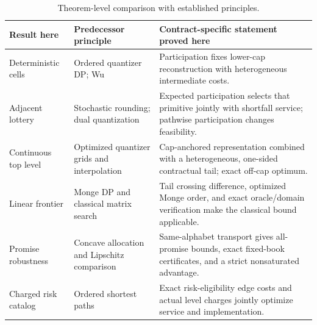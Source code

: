 \begin{table}[p]\centering
\caption{Theorem-level comparison with established principles.}\label{tab:r37-priority}
\small\begin{tabular}{p{}p{}p{}}\toprule
Result here & Predecessor principle & Contract-specific statement proved here\\\midrule
Deterministic cells & Ordered quantizer DP; Wu & Participation fixes lower-cap reconstruction with heterogeneous intermediate costs.\\[3pt]
Adjacent lottery & Stochastic rounding; dual quantization & Expected participation selects that primitive jointly with shortfall service; pathwise participation changes feasibility.\\[3pt]
Continuous top level & Optimized quantizer grids and interpolation & Cap-anchored representation combined with a heterogeneous, one-sided contractual tail; exact off-cap optimum.\\[3pt]
Linear frontier & Monge DP and classical matrix search & Tail crossing difference, optimized Monge order, and exact oracle/domain verification make the classical bound applicable.\\[3pt]
Promise robustness & Concave allocation and Lipschitz comparison & Same-alphabet transport gives all-promise bounds, exact fixed-book certificates, and a strict nonsaturated advantage.\\[3pt]
Charged risk catalog & Ordered shortest paths & Exact risk-eligibility edge costs and actual level charges jointly optimize service and implementation.\\\bottomrule
\end{tabular}
\end{table}

